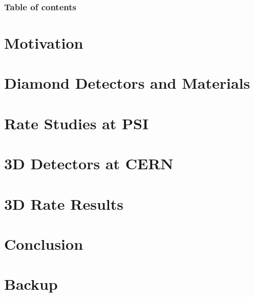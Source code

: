 \documentclass[9pt]{beamer}
\begin{document}


\begin{frame}[allowframebreaks]
	\frametitle{Table of contents}
	\tableofcontents[hideallsubsections]   %
\end{frame}

\section{Motivation}


\section{Diamond Detectors and Materials}


\section{Rate Studies at PSI}




\section{3D Detectors at CERN}


\section{3D Rate Results}


% 

\section{Conclusion}


\section*{Backup}


\end{document}
